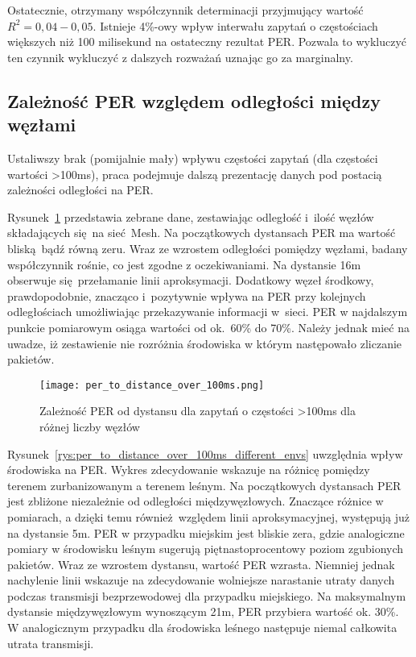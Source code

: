 Ostatecznie, otrzymany współczynnik determinacji przyjmujący wartość $R^2=0,04-0,05$.  Istnieje 4\%-owy wpływ
interwału zapytań o częstościach większych niż 100 milisekund na ostateczny rezultat PER. Pozwala to
wykluczyć ten czynnik wykluczyć z dalszych rozważań uznając go za marginalny.

\subsection{Zależność PER względem odległości między węzłami}

Ustaliwszy brak (pomijalnie mały) wpływu częstości zapytań (dla częstości wartości >100ms), praca podejmuje dalszą prezentację
danych pod postacią zależności odległości na PER.

Rysunek~\ref{rys:per_to_distance_over_100ms} przedstawia zebrane dane, zestawiając odległość i~ilość węzłów składających
się na sieć Mesh. Na początkowych dystansach PER ma wartość bliską bądź równą zeru. Wraz ze wzrostem odległości pomiędzy
węzłami, badany współczynnik rośnie, co jest zgodne z oczekiwaniami. Na dystansie 16m obserwuje się przełamanie
linii aproksymacji. Dodatkowy węzeł środkowy, prawdopodobnie, znacząco i~pozytywnie wpływa na PER przy kolejnych odległościach
umożliwiając przekazywanie informacji w~sieci. PER w najdalszym punkcie pomiarowym osiąga wartości od ok.~60\% do 70\%.
Należy jednak mieć na uwadze, iż zestawienie nie rozróżnia środowiska w którym następowało zliczanie pakietów.


\begin{figure}[!htb]
	\centering \texttt{[image: per\_to\_distance\_over\_100ms.png]}
	\caption{Zależność \gls{PER} od dystansu dla zapytań o częstości >100ms dla różnej liczby węzłów}
	\label{rys:per_to_distance_over_100ms}
\end{figure}

Rysunek~\ref{rys:per_to_distance_over_100ms_different_envs} uwzględnia wpływ środowiska na PER. Wykres zdecydowanie
wskazuje na różnicę pomiędzy terenem zurbanizowanym a terenem leśnym. Na początkowych dystansach PER jest zbliżone
niezależnie od odległości międzywęzłowych. Znaczące różnice w pomiarach, a dzięki temu również względem linii aproksymacyjnej,
występują już na dystansie 5m. PER w przypadku miejskim jest bliskie zera, gdzie analogiczne pomiary w środowisku
leśnym sugerują piętnastoprocentowy poziom zgubionych pakietów. Wraz ze wzrostem dystansu, wartość PER wzrasta.
Niemniej jednak nachylenie linii wskazuje na zdecydowanie wolniejsze narastanie utraty danych podczas transmisji
bezprzewodowej dla przypadku miejskiego. Na maksymalnym dystansie międzywęzłowym wynoszącym 21m, PER
przybiera wartość ok. 30\%. W analogicznym przypadku dla środowiska leśnego następuje niemal całkowita utrata
transmisji.

